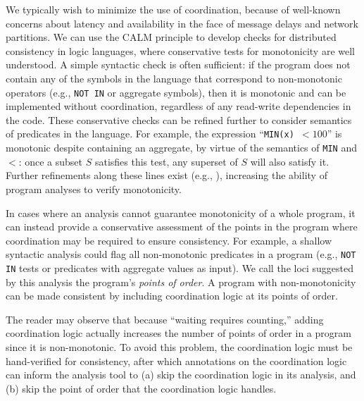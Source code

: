 We typically wish to minimize the use of coordination, because of well-known
concerns about latency and availability in the face of message delays and
network partitions.  We can use the CALM principle to develop checks for
distributed consistency in logic languages, where conservative tests for
monotonicity are well understood. A simple syntactic check is often sufficient:
if the program does not contain any of the symbols in the language that
correspond to non-monotonic operators (e.g., \texttt{NOT IN} or aggregate
symbols), then it is monotonic and can be implemented without coordination,
regardless of any read-write dependencies in the code.  These conservative
checks can be refined further to consider semantics of predicates in the
language. For example, the expression ``\texttt{MIN(x) $< 100$}'' is monotonic
despite containing an aggregate, by virtue of the semantics of \texttt{MIN} and
$<$: once a subset $S$ satisfies this test, any superset of $S$ will also
satisfy it.  Further refinements along these lines exist (e.g., \cite{ross-modular,ross-strat}), increasing the ability
of program analyses to verify monotonicity.
% 

In cases where an analysis cannot guarantee monotonicity of a whole program, it can instead provide a conservative assessment of the points in the program where coordination may be required to ensure consistency.  For example, a shallow syntactic analysis could flag all non-monotonic predicates in a program (e.g., \texttt{NOT IN} tests or predicates with aggregate values as input).
We call the loci suggested by this analysis the program's \emph{points of
order}.  A program with non-monotonicity can be made consistent by including coordination logic at its points of order.  

The reader may observe that because ``waiting requires counting,'' adding coordination logic actually increases the number of points of order in a program since it is non-monotonic.  To avoid this problem, the coordination logic must be hand-verified for consistency, after which annotations on the coordination logic can inform the analysis tool to (a) skip the coordination logic in its analysis, and (b) skip the point of order that the coordination logic handles.  

